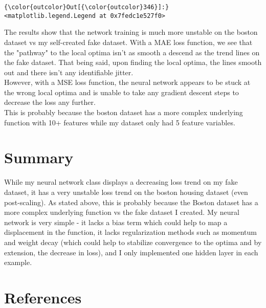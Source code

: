 \documentclass[11pt]{article}
\begin{document}
\begin{Verbatim}[commandchars=\\\{\}]
{\color{outcolor}Out[{\color{outcolor}346}]:} <matplotlib.legend.Legend at 0x7fedc1e527f0>
\end{Verbatim}
            
    \begin{center}
    \end{center}
    
    The results show that the network training is much more unstable on the
boston dataset vs my self-created fake dataset. With a MAE loss
function, we see that the "pathway" to the local optima isn't as smooth
a descend as the trend lines on the fake dataset. That being said, upon
finding the local optima, the lines smooth out and there isn't any
identifiable jitter.\\

However, with a MSE loss function, the neural network appears to be
stuck at the wrong local optima and is unable to take any gradient
descent steps to decrease the loss any further.\\

This is probably because the boston dataset has a more complex
underlying function with 10+ features while my dataset only had 5
feature variables.

    \section{Summary}\label{summary}

While my neural network class displays a decreasing loss trend on my
fake dataset, it has a very unstable loss trend on the boston housing
dataset (even post-scaling). As stated above, this is probably because
the Boston dataset has a more complex underlying function vs the fake
dataset I created. My neural network is very simple - it lacks a bias
term which could help to map a displacement in the function, it lacks
regularization methods such as momentum and weight decay (which could
help to stabilize convergence to the optima and by extension, the
decrease in loss), and I only implemented one hidden layer in each
example.
\newpage
    \section{References}\label{references}
\end{document}

